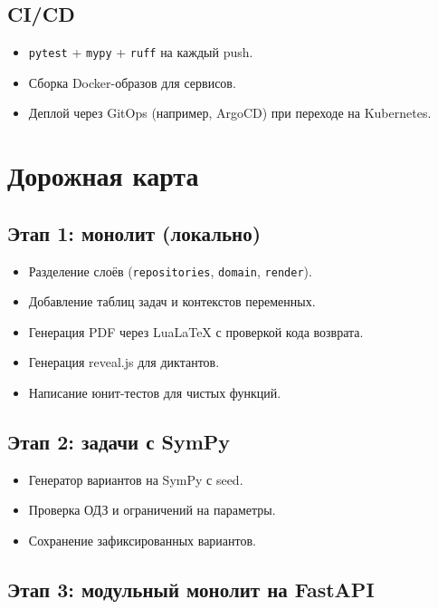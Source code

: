 \documentclass[12pt,a4paper]{article}
\newcommand{\code}[1]{\texttt{#1}}
\begin{document}
\subsection{CI/CD}

\begin{itemize}
    \item \code{pytest} + \code{mypy} + \code{ruff} на каждый push.
    \item Сборка Docker-образов для сервисов.
    \item Деплой через GitOps (например, ArgoCD) при переходе
          на Kubernetes.
\end{itemize}

\section{Дорожная карта}

\subsection{Этап 1: монолит (локально)}

\begin{itemize}
    \item Разделение слоёв (\code{repositories}, \code{domain},
          \code{render}).
    \item Добавление таблиц задач и контекстов переменных.
    \item Генерация PDF через LuaLaTeX с проверкой кода возврата.
    \item Генерация reveal.js для диктантов.
    \item Написание юнит-тестов для чистых функций.
\end{itemize}

\subsection{Этап 2: задачи с SymPy}

\begin{itemize}
    \item Генератор вариантов на SymPy с seed.
    \item Проверка ОДЗ и ограничений на параметры.
    \item Сохранение зафиксированных вариантов.
\end{itemize}

\subsection{Этап 3: модульный монолит на FastAPI}
\end{document}
